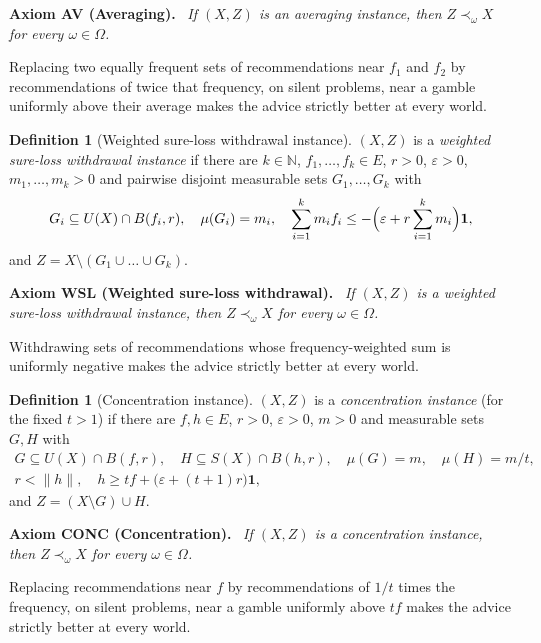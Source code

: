 \documentclass[11pt]{article}
\theoremstyle{definition}
\newtheorem{definition}[theorem]{Definition}
\newenvironment{axiom}[1]{\par\medskip\noindent\textbf{Axiom #1.}\ \itshape}{\par\medskip}
\newcommand{\one}{\mathbf 1}
\newcommand{\N}{\mathbb N}
\begin{document}
\begin{axiom}{AV (Averaging)}
If $(X,Z)$ is an averaging instance, then $Z\prec_\omega X$ for every $\omega\in\Omega$.
\end{axiom}
\noindent Replacing two equally frequent sets of recommendations near $f_1$ and $f_2$ by recommendations of twice that frequency, on silent problems, near a gamble uniformly above their average makes the advice strictly better at every world.

\begin{definition}[Weighted sure-loss withdrawal instance]\label{def:WSL}
$(X,Z)$ is a \emph{weighted sure-loss withdrawal instance} if there are $k\in\N$, $f_1,\dots,f_k\in E$, $r>0$, $\varepsilon>0$, $m_1,\dots,m_k>0$ and pairwise disjoint measurable sets $G_1,\dots,G_k$ with
\[
G_i\subseteq U(X)\cap B(f_i,r),\quad \mu(G_i)=m_i,\quad \sum_{i=1}^km_if_i\le-\Bigl(\varepsilon+r\sum_{i=1}^km_i\Bigr)\one,
\]
and $Z=X\setminus(G_1\cup\dots\cup G_k)$.
\end{definition}

\begin{axiom}{WSL (Weighted sure-loss withdrawal)}
If $(X,Z)$ is a weighted sure-loss withdrawal instance, then $Z\prec_\omega X$ for every $\omega\in\Omega$.
\end{axiom}
\noindent Withdrawing sets of recommendations whose frequency-weighted sum is uniformly negative makes the advice strictly better at every world.

\begin{definition}[Concentration instance]\label{def:CONC}
$(X,Z)$ is a \emph{concentration instance} (for the fixed $t>1$) if there are $f,h\in E$, $r>0$, $\varepsilon>0$, $m>0$ and measurable sets $G,H$ with
\begin{gather*}
G\subseteq U(X)\cap B(f,r),\quad H\subseteq S(X)\cap B(h,r),\quad \mu(G)=m,\quad \mu(H)=m/t,\\
r<\|h\|,\quad h\ge tf+\bigl(\varepsilon+(t+1)r\bigr)\one,
\end{gather*}
and $Z=(X\setminus G)\cup H$.
\end{definition}

\begin{axiom}{CONC (Concentration)}
If $(X,Z)$ is a concentration instance, then $Z\prec_\omega X$ for every $\omega\in\Omega$.
\end{axiom}
\noindent Replacing recommendations near $f$ by recommendations of $1/t$ times the frequency, on silent problems, near a gamble uniformly above $tf$ makes the advice strictly better at every world.
\end{document}
